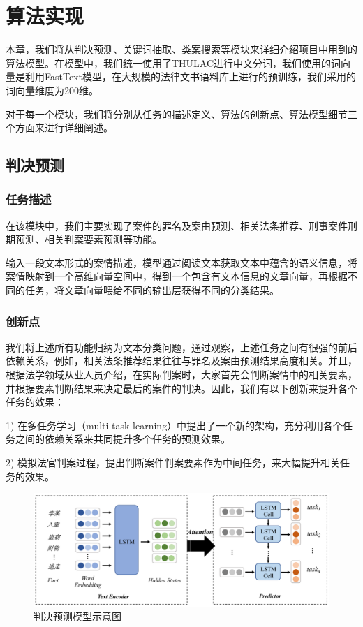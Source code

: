 \chapter{算法实现}
本章，我们将从判决预测、关键词抽取、类案搜索等模块来详细介绍项目中用到的算法模型。在模型中，我们统一使用了THULAC进行中文分词，我们使用的词向量是利用FastText模型，在大规模的法律文书语料库上进行的预训练，我们采用的词向量维度为200维。

对于每一个模块，我们将分别从任务的描述定义、算法的创新点、算法模型细节三个方面来进行详细阐述。


\section{判决预测}
\subsection{任务描述}
在该模块中，我们主要实现了案件的罪名及案由预测、相关法条推荐、刑事案件刑期预测、相关判案要素预测等功能。

输入一段文本形式的案情描述，模型通过阅读文本获取文本中蕴含的语义信息，将案情映射到一个高维向量空间中，得到一个包含有文本信息的文章向量，再根据不同的任务，将文章向量喂给不同的输出层获得不同的分类结果。

\subsection{创新点}
我们将上述所有功能归纳为文本分类问题，通过观察，上述任务之间有很强的前后依赖关系，例如，相关法条推荐结果往往与罪名及案由预测结果高度相关。并且，根据法学领域从业人员介绍，在实际判案时，大家首先会判断案情中的相关要素，并根据要素判断结果来决定最后的案件的判决。因此，我们有以下创新来提升各个任务的效果：

1)	在多任务学习（multi-task learning）中提出了一个新的架构，充分利用各个任务之间的依赖关系来共同提升多个任务的预测效果。

2)	模拟法官判案过程，提出判断案件判案要素作为中间任务，来大幅提升相关任务的效果。

\begin{figure}[ht]
    \centering
    \includegraphics[width=\linewidth]{figures/model1}
    \caption{判决预测模型示意图}
    \label{fig:model1}
\end{figure}

